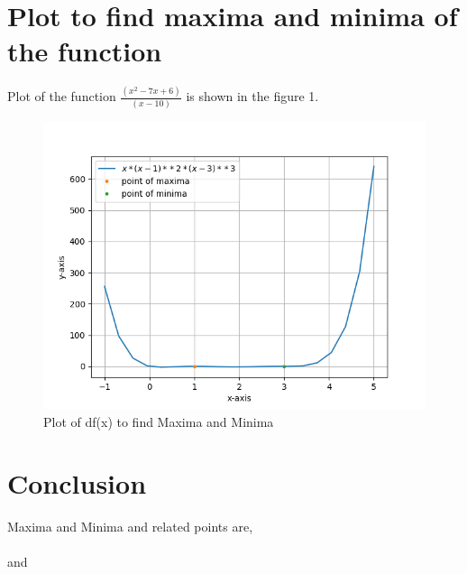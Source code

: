\documentclass[10pt,twocolumn]{article}
\begin{document}
\section{Plot to find maxima and minima of the function}
\vspace{0.25cm}
Plot of the function $\frac{(x^2-7x+6)}{(x-10)}$ is shown in the figure 1.
\begin{figure}[h]
\includegraphics[width=1\columnwidth]{opt.png}
\caption{Plot of df(x) to find Maxima and Minima}
\label{Optimization of Machince A and B}
\end{figure}

\section{Conclusion}
\begin{flushleft}
Maxima and Minima and related points are, \\
\vspace{0.25cm}
\center
{} \\
\vspace{0.25cm}
and \\
\vspace{0.25cm}
\endcenter
\end{flushleft}
\end{document}
